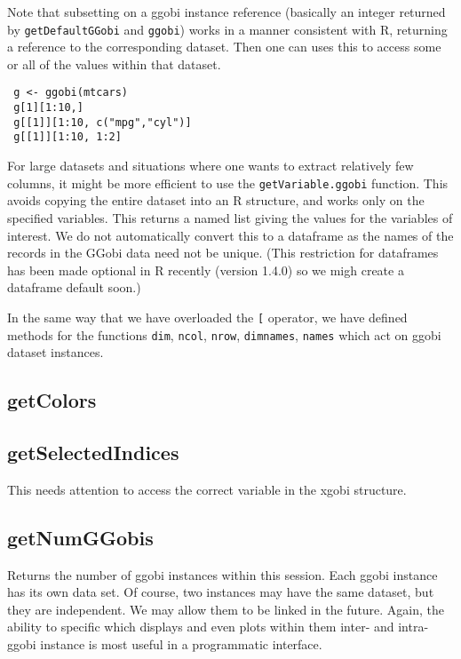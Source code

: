 \documentclass{article}
\def\SFunction#1{{\texttt{\red #1}}}
\begin{document}
Note that subsetting on a ggobi instance reference (basically an
integer returned by \SFunction{getDefaultGGobi} and \SFunction{ggobi})
works in a manner consistent with R, returning a reference
to the corresponding dataset.
Then one can uses this to access
some or all of the values within that dataset.
\begin{verbatim}
 g <- ggobi(mtcars)
 g[1][1:10,]
 g[[1]][1:10, c("mpg","cyl")]
 g[[1]][1:10, 1:2]
\end{verbatim}

For large datasets and situations where one wants to extract
relatively few columns, it might be more efficient to use the
\SFunction{getVariable.ggobi} function.  This avoids copying the
entire dataset into an R structure, and works only on the specified
variables.  This returns a named list giving the values for the
variables of interest.  We do not automatically convert this to a
dataframe as the names of the records in the GGobi data need not be
unique.  (This restriction for dataframes has been made optional in R
recently (version 1.4.0) so we migh create a dataframe default soon.)

In the same way that we have overloaded the \SFunction{[} operator, we
  have defined methods for the functions \SFunction{dim},
  \SFunction{ncol}, \SFunction{nrow}, \SFunction{dimnames},
  \SFunction{names} which act on ggobi dataset instances.


\subsection{getColors}


\subsection{getSelectedIndices}
This needs attention to access the correct
variable in the xgobi structure.


\subsection{getNumGGobis}
Returns the number of ggobi instances within this session.  Each ggobi
instance has its own data set. Of course, two instances may have the
same dataset, but they are independent.  We may allow them to be
linked in the future.  Again, the ability to specific which displays
and even plots within them inter- and intra- ggobi instance is most
useful in a programmatic interface.
\end{document}
